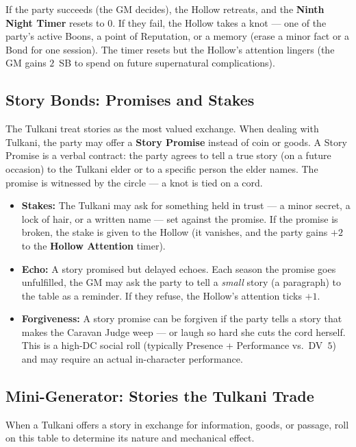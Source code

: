 If the party succeeds (the GM decides), the Hollow retreats, and the \textbf{Ninth Night Timer } resets to $0$. If they fail, the Hollow takes a knot --- one of the party's active Boons, a point of Reputation, or a memory (erase a minor fact or a Bond for one session). The timer resets but the Hollow's attention lingers (the GM gains $2$~SB to spend on future supernatural complications).

\subsection*{Story Bonds: Promises and Stakes}
\label{subsec:tulkani-story-economy}

The Tulkani treat stories as the most valued exchange. When dealing with Tulkani, the party may offer a \textbf{Story Promise} instead of coin or goods. A Story Promise is a verbal contract: the party agrees to tell a true story (on a future occasion) to the Tulkani elder or to a specific person the elder names. The promise is witnessed by the circle --- a knot is tied on a cord.

\begin{itemize}
\item \textbf{Stakes:} The Tulkani may ask for something held in trust --- a minor secret, a lock of hair, or a written name --- set against the promise. If the promise is broken, the stake is given to the Hollow (it vanishes, and the party gains $+2$ to the \textbf{Hollow Attention} timer).
\item \textbf{Echo:} A story promised but delayed echoes. Each season the promise goes unfulfilled, the GM may ask the party to tell a \emph{small} story (a paragraph) to the table as a reminder. If they refuse, the Hollow's attention ticks $+1$.
\item \textbf{Forgiveness:} A story promise can be forgiven if the party tells a story that makes the Caravan Judge weep --- or laugh so hard she cuts the cord herself. This is a high-DC social roll (typically Presence + Performance vs.\ DV~$5$) and may require an actual in-character performance.
\end{itemize}

\subsection*{Mini-Generator: Stories the Tulkani Trade}
\label{subsec:tulkani-story-generator}

When a Tulkani offers a story in exchange for information, goods, or passage, roll on this table to determine its nature and mechanical effect.

